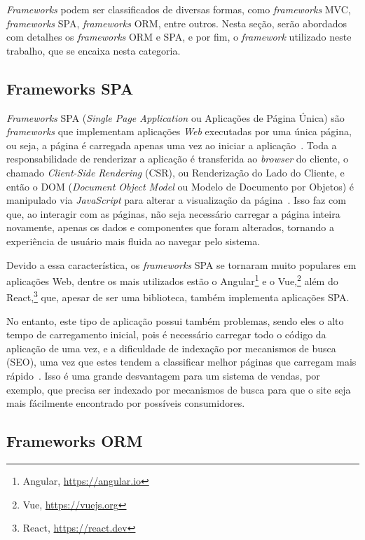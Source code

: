 \textit{Frameworks} podem ser classificados de diversas formas, como \textit{frameworks} MVC,
\textit{frameworks} SPA, \textit{frameworks} ORM, entre outros. Nesta seção, serão abordados
com detalhes os \textit{frameworks} ORM e SPA, e por fim, o \textit{framework} utilizado neste trabalho,
que se encaixa nesta categoria.

\subsection{Frameworks SPA}
\label{sec-fundteo-framework-spa}

\textit{Frameworks} SPA (\textit{Single Page Application} ou Aplicações de Página Única) são \textit{frameworks} que implementam
aplicações \textit{Web} executadas por uma única página, ou seja, a página é carregada apenas uma vez 
ao iniciar a aplicação~\cite{emmitt:2015}. Toda a responsabilidade de renderizar a aplicação é
transferida ao \textit{browser} do cliente, o chamado \textit{Client-Side Rendering} (CSR), ou Renderização do Lado do Cliente,
e então o DOM (\textit{Document Object Model} ou Modelo de Documento por Objetos) é manipulado via \textit{JavaScript} para alterar a visualização da 
página~\cite{emmitt:2015,konshin:2018}. Isso faz com que, ao interagir com as páginas, não 
seja necessário carregar a página inteira novamente, apenas os dados e componentes que foram alterados, 
tornando a experiência de usuário mais fluida ao navegar pelo sistema. 

Devido a essa característica, os \textit{frameworks} SPA se tornaram muito populares em aplicações
Web, dentre os mais utilizados estão o Angular\footnote{Angular, \url{https://angular.io}}
e o Vue,\footnote{Vue, \url{https://vuejs.org}} além do React,\footnote{React, \url{https://react.dev}}
que, apesar de ser uma biblioteca, também implementa aplicações SPA.

No entanto, este tipo de aplicação possui também problemas, sendo eles o alto tempo de carregamento
inicial, pois é necessário carregar todo o código da aplicação de uma vez, e a dificuldade de
indexação por mecanismos de busca (SEO), uma vez que estes tendem a classificar melhor
páginas que carregam mais rápido~\cite{konshin:2018}. Isso é uma grande desvantagem para um sistema
de vendas, por exemplo, que precisa ser indexado por mecanismos de busca para que o site seja mais
fácilmente encontrado por possíveis consumidores.

\subsection{Frameworks ORM}
\label{sec-fundteo-framework-orm}

